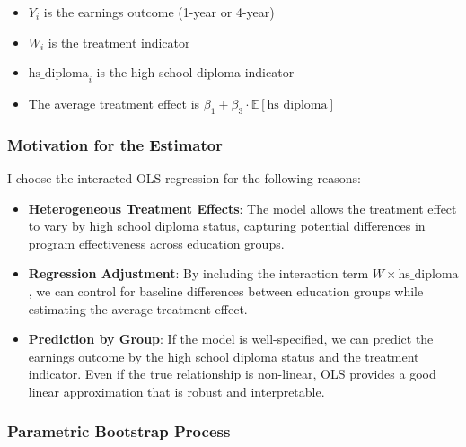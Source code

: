 \documentclass[11pt]{article}
\numberwithin{equation}{section}
\begin{document}
\begin{itemize}
    \item $Y_i$ is the earnings outcome (1-year or 4-year)
    \item $W_i$ is the treatment indicator
    \item $\text{hs\_diploma}_i$ is the high school diploma indicator
    \item The average treatment effect is $\beta_1 + \beta_3 \cdot \mathbb{E}[\text{hs\_diploma}]$
\end{itemize}

\subsubsection{Motivation for the Estimator}

I choose the interacted OLS regression for the following reasons:

\begin{itemize}
    \item \textbf{Heterogeneous Treatment Effects}: The model allows the treatment effect to vary by high school diploma status, capturing potential differences in program effectiveness across education groups.
    
    \item \textbf{Regression Adjustment}: By including the interaction term $W \times \text{hs\_diploma}$, we can control for baseline differences between education groups while estimating the average treatment effect.
    
    \item \textbf{Prediction by Group}: If the model is well-specified, we can predict the earnings outcome by the high school diploma status and the treatment indicator. Even if the true relationship is non-linear, OLS provides a good linear approximation that is robust and interpretable.
\end{itemize}


\subsubsection{Parametric Bootstrap Process}
\end{document}
